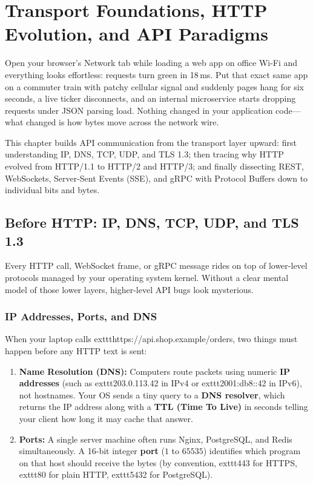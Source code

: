 \chapter{Transport Foundations, HTTP Evolution, and API Paradigms}
\label{chap:http-apis}

Open your browser's Network tab while loading a web app on office Wi-Fi and everything looks effortless: requests turn green in 18\,ms. Put that exact same app on a commuter train with patchy cellular signal and suddenly pages hang for six seconds, a live ticker disconnects, and an internal microservice starts dropping requests under JSON parsing load. Nothing changed in your application code---what changed is how bytes move across the network wire.

This chapter builds API communication from the transport layer upward: first understanding IP, DNS, TCP, UDP, and TLS 1.3; then tracing why HTTP evolved from HTTP/1.1 to HTTP/2 and HTTP/3; and finally dissecting REST, WebSockets, Server-Sent Events (SSE), and gRPC with Protocol Buffers down to individual bits and bytes.

\section{Before HTTP: IP, DNS, TCP, UDP, and TLS 1.3}

Every HTTP call, WebSocket frame, or gRPC message rides on top of lower-level protocols managed by your operating system kernel. Without a clear mental model of those lower layers, higher-level API bugs look mysterious.

\subsection{IP Addresses, Ports, and DNS}

When your laptop calls 	exttt{https://api.shop.example/orders}, two things must happen before any HTTP text is sent:
\begin{enumerate}[leftmargin=15pt]
  \item \textbf{Name Resolution (DNS):} Computers route packets using numeric \textbf{IP addresses} (such as 	exttt{203.0.113.42} in IPv4 or 	exttt{2001:db8::42} in IPv6), not hostnames. Your OS sends a tiny query to a \textbf{DNS resolver}, which returns the IP address along with a \textbf{TTL (Time To Live)} in seconds telling your client how long it may cache that answer.
  \item \textbf{Ports:} A single server machine often runs Nginx, PostgreSQL, and Redis simultaneously. A 16-bit integer \textbf{port} ($1$ to $65535$) identifies which program on that host should receive the bytes (by convention, 	exttt{443} for HTTPS, 	exttt{80} for plain HTTP, 	exttt{5432} for PostgreSQL).
\end{enumerate}

